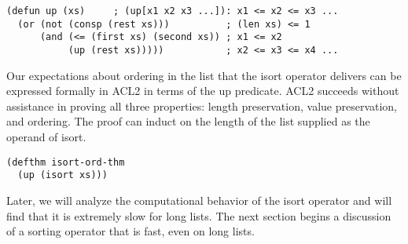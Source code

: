 \label{defun:up}
\begin{code}
\begin{verbatim}
(defun up (xs)     ; (up[x1 x2 x3 ...]): x1 <= x2 <= x3 ...
  (or (not (consp (rest xs)))          ; (len xs) <= 1
      (and (<= (first xs) (second xs)) ; x1 <= x2
           (up (rest xs)))))           ; x2 <= x3 <= x4 ...
\end{verbatim}
\end{code}

Our expectations about ordering in the list that the \textsf{isort} operator
delivers can be expressed formally in ACL2 in terms of the \textsf{up} predicate.
ACL2 succeeds without assistance in proving
all three properties: length preservation,
value preservation, and ordering.
The proof can induct on the length
of the list supplied as the operand of \textsf{isort}.

\label{defthm:isort-ord-thm}
\begin{code}
\begin{verbatim}
(defthm isort-ord-thm
  (up (isort xs)))
\end{verbatim}
\end{code}

Later, we will analyze the computational behavior of the \textsf{isort} operator
and will find that it is extremely slow for long lists.
The next section begins a discussion of a sorting operator
that is fast, even on long lists.

